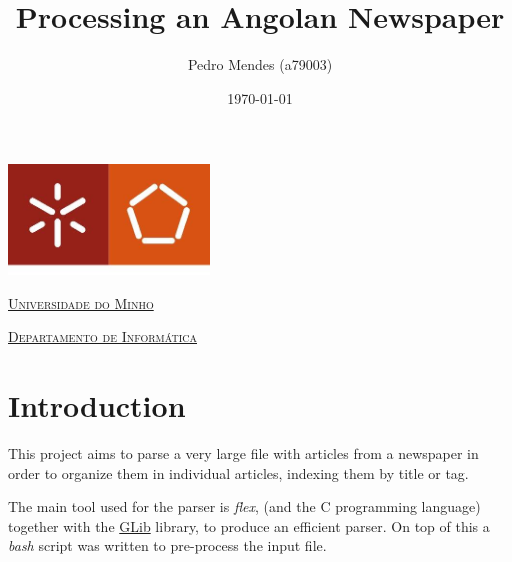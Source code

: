 \documentclass[a4paper]{article}
\begin{document}
\title{Processing an Angolan Newspaper}
\author{Pedro Mendes (a79003)}
\date{\today}

\begin{titlepage}

    \thispagestyle{empty}
    \begin{center}
        \begin{minipage}{0.75\linewidth}
            \centering
            \includegraphics[width=0.4\textwidth]{eng.jpeg}\par\vspace{1cm}
            \vspace{1.5cm}
            \href{https://www.uminho.pt/PT}{\scshape\LARGE Universidade do Minho} \par
            \vspace{1cm}
            \href{https://www.di.uminho.pt/}{\scshape\Large Departamento de Informática} \par
            \vspace{1.5cm}

            \maketitle
        \end{minipage}
    \end{center}

\end{titlepage}

\tableofcontents

\pagebreak

\section{Introduction}
This project aims to parse a very large file with articles from a newspaper in
order to organize them in individual articles, indexing them by title or tag.

The main tool used for the parser is \textit{flex}, (and the C programming
language) together with the \href{https://developer.gnome.org/}{GLib} library,
to produce an efficient parser. On top of this a \textit{bash} script was
written to pre-process the input file.
\end{document}
